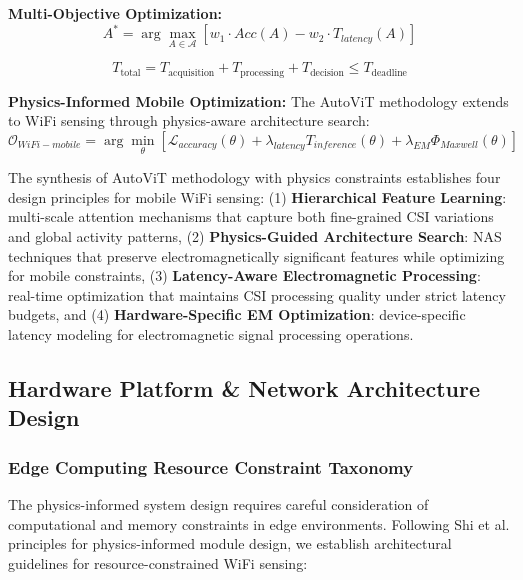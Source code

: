 \documentclass[journal]{IEEEtran}
\begin{document}
\textbf{Multi-Objective Optimization:}
\begin{equation}
A^* = \arg\max_{A \in \mathcal{A}} \left[ w_1 \cdot Acc(A) - w_2 \cdot T_{latency}(A) \right]
\label{eq:autovit_optimization}
\end{equation}

\begin{equation}
T_{\text{total}} = T_{\text{acquisition}} + T_{\text{processing}} + T_{\text{decision}} \leq T_{\text{deadline}}
\label{eq:realtime_constraint}
\end{equation}

\textbf{Physics-Informed Mobile Optimization:} The AutoViT methodology extends to WiFi sensing through physics-aware architecture search:
\begin{equation}
\mathcal{O}_{WiFi-mobile} = \arg\min_{\theta} \left[ \mathcal{L}_{accuracy}(\theta) + \lambda_{latency} T_{inference}(\theta) + \lambda_{EM} \Phi_{Maxwell}(\theta) \right]
\label{eq:physics_mobile_opt}
\end{equation}

The synthesis of AutoViT methodology with physics constraints establishes four design principles for mobile WiFi sensing: (1) \textbf{Hierarchical Feature Learning}: multi-scale attention mechanisms that capture both fine-grained CSI variations and global activity patterns, (2) \textbf{Physics-Guided Architecture Search}: NAS techniques that preserve electromagnetically significant features while optimizing for mobile constraints, (3) \textbf{Latency-Aware Electromagnetic Processing}: real-time optimization that maintains CSI processing quality under strict latency budgets, and (4) \textbf{Hardware-Specific EM Optimization}: device-specific latency modeling for electromagnetic signal processing operations.

\subsection{Hardware Platform \& Network Architecture Design}

\subsubsection{Edge Computing Resource Constraint Taxonomy}

The physics-informed system design requires careful consideration of computational and memory constraints in edge environments. Following Shi et al. \cite{shi2023simplified} principles for physics-informed module design, we establish architectural guidelines for resource-constrained WiFi sensing:
\end{document}
